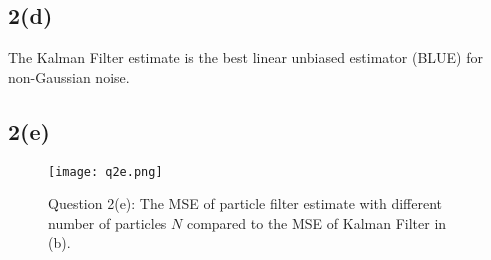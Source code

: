 \documentclass[a4paper, 11pt]{article}
\begin{document}
\subsection*{2(d)}

The Kalman Filter estimate is the best linear unbiased estimator (BLUE) for non-Gaussian noise. 



\subsection*{2(e)}

\begin{figure}
	\begin{center}
		\texttt{[image: q2e.png]}
		\caption{Question 2(e): The MSE of particle filter estimate with different number of particles $N$ compared to the MSE of Kalman Filter in (b). }
	\end{center}
\end{figure}
\end{document}
